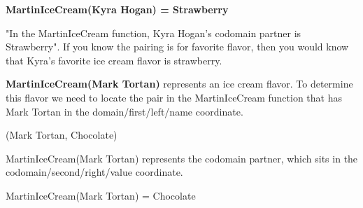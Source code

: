 \documentclass{ximera}
\begin{document}
\begin{center}
\textbf{MartinIceCream(Kyra Hogan) = Strawberry}
\end{center}

"In the MartinIceCream function, Kyra Hogan's codomain partner is  Strawberry". If you know the pairing is for favorite flavor, then you would know that Kyra's favorite ice cream flavor is strawberry.


\begin{example}
\textbf{MartinIceCream(Mark Tortan)} represents an ice cream flavor. To determine this flavor we need to locate the pair in the MartinIceCream function that has Mark Tortan in the domain/first/left/name coordinate.

\begin{center}
(Mark Tortan, Chocolate)
\end{center}

MartinIceCream(Mark Tortan) represents the codomain partner, which sits in the codomain/second/right/value coordinate.

\begin{center}
MartinIceCream(Mark Tortan) = Chocolate    
\end{center}
\end{example}
\end{document}
